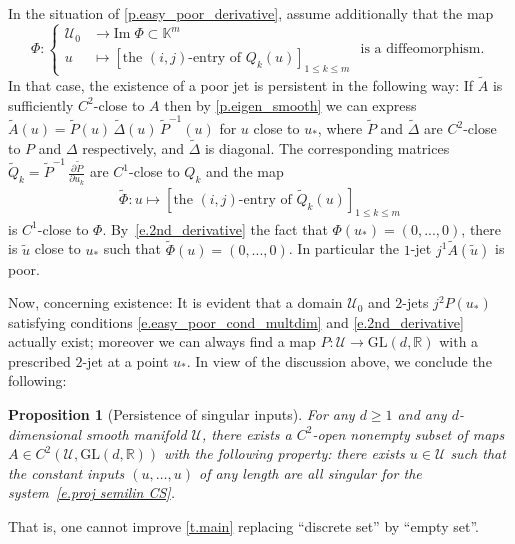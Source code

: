 \documentclass[10pt, a4paper]{amsart}
\theoremstyle{plain}
\newtheorem{prop}[lemma]{Proposition}
\theoremstyle{definition}
\theoremstyle{remark}
\theoremstyle{note}
\numberwithin{equation}{section}
\begin{document}
In the situation of \cref{p.easy_poor_derivative},
assume additionally that the map
\begin{equation}\label{e.2nd_derivative}
\Phi\colon \begin{cases}
{\mathcal{U}}_0& \to {\mathrm{Im}\;} \Phi \subset {\mathbb{K}}^m\\
u&\mapsto \left[ \text{the $(i,j)$-entry of } Q_k (u)
\right]_{1\leq k \leq m}
\end{cases} \mbox{ is a diffeomorphism. } 
\end{equation}
In that case, the existence of a poor jet is persistent in the following way:
If $\tilde A$ is sufficiently $C^2$-close to $A$
then by \cref{p.eigen_smooth} we can express 
$\tilde A (u) = \tilde P(u) \, \tilde \Delta(u) \, \tilde P^{-1}(u)$
for $u$ close to $u_*$, where $\tilde P$ and $\tilde \Delta$ are $C^2$-close to $P$ and $\Delta$ respectively, and $\tilde \Delta$ is diagonal.
The corresponding matrices $\tilde Q_k = \tilde P^{-1} \, \frac{\partial \tilde P}{\partial u_k} $ are $C^1$-close to $Q_k$ and the map 
\begin{align*}
\tilde \Phi \colon u \mapsto \left[ \text{the $(i,j)$-entry of } \tilde Q_k (u)
\right]_{1\leq k \leq m}
\end{align*}
is $C^1$-close to $\Phi$. By~\eqref{e.2nd_derivative} the fact that $\Phi(u_*)=(0,...,0)$,  there is $\tilde u$ close to $u_*$ such that $\tilde \Phi(u)=(0,...,0)$.
In particular the $1$-jet $j^1 \tilde A(\tilde u)$ is poor.

Now, concerning existence:
It is evident that a domain ${\mathcal{U}}_0$ and $2$-jets $j^2 P(u_*)$ satisfying conditions \eqref{e.easy_poor_cond_multdim} and \eqref{e.2nd_derivative} actually exist; moreover we can always find a map $P \colon {\mathcal{U}} \to {\mathrm{GL}}(d,{\mathbb{R}})$ with a prescribed $2$-jet at a point $u_*$. In view of the discussion above, we conclude the following:

\begin{prop}[Persistence of singular inputs]\label{p.persistent_poorness}
For any $d\geq 1$ and any $d$-dimensional smooth manifold ${\mathcal{U}}$,
there exists a $C^2$-open nonempty subset of maps $A\in C^2({\mathcal{U}},{\mathrm{GL}}(d,{\mathbb{R}}))$
with the following property:
there exists $u \in {\mathcal{U}}$ such that the constant inputs $(u,\dots,u)$ of any length are all singular for the system~\eqref{e.proj semilin CS}.
\end{prop}

That is, one cannot improve \cref{t.main} replacing ``discrete set'' by ``empty set''.
\end{document}

